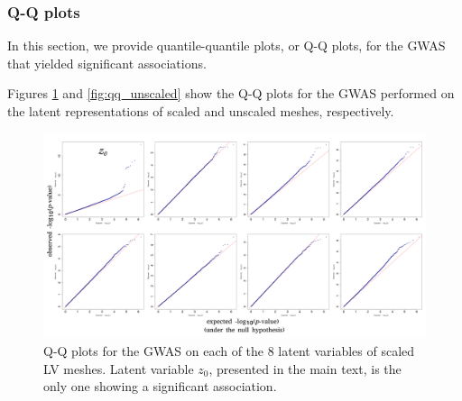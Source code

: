 \documentclass[fleqn,10pt]{wlscirep}
\begin{document}
\subsubsection{Q-Q plots}
In this section, we provide quantile-quantile plots, or Q-Q plots, for the GWAS that yielded significant associations. %


Figures \ref{fig:qq_scaled} and \ref{fig:qq_unscaled} show the Q-Q plots for the GWAS performed on the latent representations of scaled and unscaled meshes, respectively.

\begin{figure}
 \centering
 \includegraphics[width=\textwidth]{figs/supplementary/scaled_qq.png}
 \caption{Q-Q plots for the GWAS on each of the 8 latent variables of scaled LV meshes. Latent variable $z_0$, presented in the main text, is the only one showing a significant association.}
 \label{fig:qq_scaled}
\end{figure}
\end{document}
